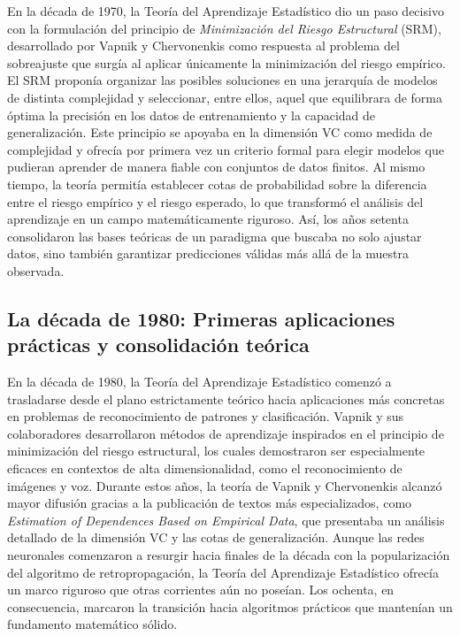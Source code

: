 \documentclass{report}
\begin{document}
En la década de 1970, la Teoría del Aprendizaje Estadístico dio un paso decisivo con la formulación del principio de \textit{Minimización del Riesgo Estructural} (SRM), desarrollado por Vapnik y Chervonenkis como respuesta al problema del sobreajuste que surgía al aplicar únicamente la minimización del riesgo empírico. El SRM proponía organizar las posibles soluciones en una jerarquía de modelos de distinta complejidad y seleccionar, entre ellos, aquel que equilibrara de forma óptima la precisión en los datos de entrenamiento y la capacidad de generalización. Este principio se apoyaba en la dimensión VC como medida de complejidad y ofrecía por primera vez un criterio formal para elegir modelos que pudieran aprender de manera fiable con conjuntos de datos finitos. Al mismo tiempo, la teoría permitía establecer cotas de probabilidad sobre la diferencia entre el riesgo empírico y el riesgo esperado, lo que transformó el análisis del aprendizaje en un campo matemáticamente riguroso. Así, los años setenta consolidaron las bases teóricas de un paradigma que buscaba no solo ajustar datos, sino también garantizar predicciones válidas más allá de la muestra observada.

\subsection{La década de 1980: Primeras aplicaciones prácticas y consolidación teórica}

En la década de 1980, la Teoría del Aprendizaje Estadístico comenzó a trasladarse desde el plano estrictamente teórico hacia aplicaciones más concretas en problemas de reconocimiento de patrones y clasificación. Vapnik y sus colaboradores desarrollaron métodos de aprendizaje inspirados en el principio de minimización del riesgo estructural, los cuales demostraron ser especialmente eficaces en contextos de alta dimensionalidad, como el reconocimiento de imágenes y voz. Durante estos años, la teoría de Vapnik y Chervonenkis alcanzó mayor difusión gracias a la publicación de textos más especializados, como \textit{Estimation of Dependences Based on Empirical Data}, que presentaba un análisis detallado de la dimensión VC y las cotas de generalización. Aunque las redes neuronales comenzaron a resurgir hacia finales de la década con la popularización del algoritmo de retropropagación, la Teoría del Aprendizaje Estadístico ofrecía un marco riguroso que otras corrientes aún no poseían. Los ochenta, en consecuencia, marcaron la transición hacia algoritmos prácticos que mantenían un fundamento matemático sólido.
\end{document}
